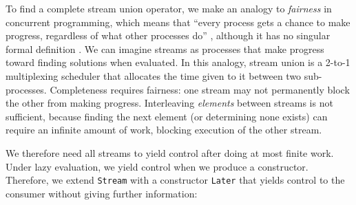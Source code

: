 \documentclass[acmsmall,screen,dvipsnames,svgnames]{acmart}
\newcommand\hask[1]{\texttt{#1}}
\newcommand\todo[1]{{\color{Orange}#1}}
\renewcommand\todo[1]{{\color{IndianRed}#1}}
\renewcommand\todo[1]{\ignorespaces}
\begin{document}




To find a complete stream union operator, we make an analogy to \emph{fairness} in concurrent programming, which means that ``every process gets a chance to make progress, regardless of what other processes do'' \citep{DBLP:journals/toplas/OwickiL82}%
, although it has no singular formal definition \citep{Kwiatkowska1989,DBLP:conf/concur/VolzerVK05}%
.
We can imagine streams as processes that make progress toward finding solutions when evaluated.
In this analogy, stream union is a 2-to-1 multiplexing scheduler that allocates the time given to it between two sub-processes.
Completeness requires fairness: one stream may not permanently block the other from making progress.
Interleaving \emph{elements} between streams is not sufficient, because finding the next element (or determining none exists) can require an infinite amount of work, blocking execution of the other stream.

We therefore need all streams to yield control after doing at most finite work.
Under lazy evaluation, we yield control when we produce a constructor.
Therefore, we extend \hask{Stream} with a constructor \hask{Later} that yields control to the consumer without giving further information:
\end{document}
